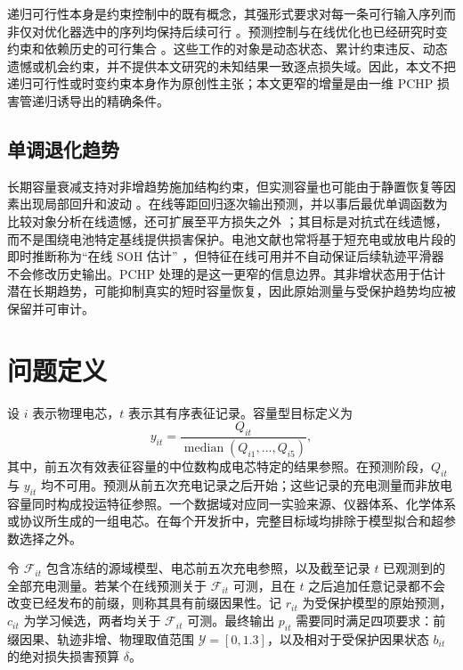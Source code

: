 \documentclass[UTF8,11pt]{ctexart}
\begin{document}
递归可行性本身是约束控制中的既有概念，其强形式要求对每一条可行输入序列而非仅对优化器选中的序列均保持后续可行 \citep{lofberg2012oops}。预测控制与在线优化也已经研究时变约束和依赖历史的可行集合 \citep{li2021information,garber2024projectionfree,knaup2026recursively}。这些工作的对象是动态状态、累计约束违反、动态遗憾或机会约束，并不提供本文研究的未知结果一致逐点损失域。因此，本文不把递归可行性或时变约束本身作为原创性主张；本文更窄的增量是由一维 PCHP 损害管递归诱导出的精确条件。

\subsection{单调退化趋势}

长期容量衰减支持对非增趋势施加结构约束，但实测容量也可能由于静置恢复等因素出现局部回升和波动 \citep{ma2021regeneration}。在线等距回归逐次输出预测，并以事后最优单调函数为比较对象分析在线遗憾，还可扩展至平方损失之外 \citep{kotlowski2016online}；其目标是对抗式在线遗憾，而不是围绕电池特定基线提供损害保护。电池文献也常将基于短充电或放电片段的即时推断称为“在线 SOH 估计” \citep{liu2020online}，但特征在线可用并不自动保证后续轨迹平滑器不会修改历史输出。PCHP 处理的是这一更窄的信息边界。其非增状态用于估计潜在长期趋势，可能抑制真实的短时容量恢复，因此原始测量与受保护趋势均应被保留并可审计。

\section{问题定义}

设 $i$ 表示物理电芯，$t$ 表示其有序表征记录。容量型目标定义为
\begin{equation}
  y_{it}=\frac{Q_{it}}{\operatorname{median}(Q_{i1},\ldots,Q_{i5})},
  \label{eq:soh_zh}
\end{equation}
其中，前五次有效表征容量的中位数构成电芯特定的结果参照。在预测阶段，$Q_{it}$ 与 $y_{it}$ 均不可用。预测从前五次充电记录之后开始；这些记录的充电测量而非放电容量同时构成投运特征参照。一个数据域对应同一实验来源、仪器体系、化学体系或协议所生成的一组电芯。在每个开发折中，完整目标域均排除于模型拟合和超参数选择之外。

令 $\mathcal F_{it}$ 包含冻结的源域模型、电芯前五次充电参照，以及截至记录 $t$ 已观测到的全部充电测量。若某个在线预测关于 $\mathcal F_{it}$ 可测，且在 $t$ 之后追加任意记录都不会改变已经发布的前缀，则称其具有前缀因果性。记 $r_{it}$ 为受保护模型的原始预测，$c_{it}$ 为学习候选，两者均关于 $\mathcal F_{it}$ 可测。最终输出 $p_{it}$ 需要同时满足四项要求：前缀因果、轨迹非增、物理取值范围 $\mathcal Y=[0,1.3]$，以及相对于受保护因果状态 $b_{it}$ 的绝对损失损害预算 $\delta$。
\end{document}
